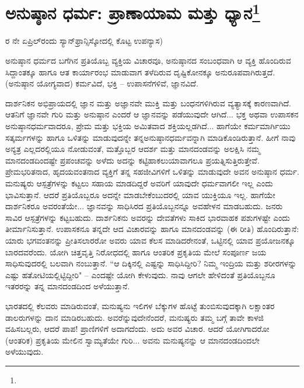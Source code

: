 
\chapter[ಅನುಷ್ಠಾನ ಧರ್ಮ: ಪ್ರಾಣಾಯಾಮ ಮತ್ತು ಧ್ಯಾನ]{ಅನುಷ್ಠಾನ ಧರ್ಮ: ಪ್ರಾಣಾಯಾಮ ಮತ್ತು ಧ್ಯಾನ\protect\footnote{}}

\begin{center}
ರ ನೇ ಏಪ್ರಿಲ್‌ರಂದು ಸ್ಯಾನ್‌ಫ್ರಾನ್ಸಿಸ್ಕೋದಲ್ಲಿ ಕೊಟ್ಟ ಉಪನ್ಯಾಸ)
\end{center}

ಅನುಷ್ಠಾನ ಧರ್ಮದ ಬಗೆಗಿನ ಪ್ರತಿಯೊಬ್ಬ ವ್ಯಕ್ತಿಯ ವಿಚಾರವೂ, ಅನುಷ್ಠಾನದ ಸಂಬಂಧವಾಗಿ ಆ ವ್ಯಕ್ತಿ ಹೊಂದಿರುವ ಸಿದ್ದಾಂತಕ್ಕೂ ಹಾಗೂ ಆತ ಕಾರ್ಯಾರಂಭ ಮಾಡುವಾಗ ತಳೆದಿರುವ ದೃಷ್ಟಿಕೋನಕ್ಕೂ ಅನುರೂಪವಾಗಿರುತ್ತದೆ. (ಅನುಷ್ಠಾನ ಯೋಗ್ಯವಾದ) ಕರ್ಮವಿದೆ, ಭಕ್ತಿ – ಉಪಾಸನೆಗಳಿವೆ, ಜ್ಞಾನವಿದೆ.

ದಾರ್ಶನಿಕನ ಅಭಿಪ್ರಾಯದಲ್ಲಿ ಜ್ಞಾನ ಮತ್ತು ಅಜ್ಞಾನವೇ ಮುಕ್ತಿ ಮತ್ತು ಬಂಧನಗಳಿಗಿರುವ ವ್ಯತ್ಯಾಸಕ್ಕೆ ಕಾರಣವಾಗಿದೆ. ಆತನಿಗೆ ಜ್ಞಾನವೇ ಗುರಿ ಮತ್ತು ಅನುಷ್ಠಾನ ಎಂದರೆ ಆ ಜ್ಞಾನವನ್ನು ಪಡೆಯುವುದೇ ಆಗಿದೆ... ಭಕ್ತ ಅಥವಾ ಉಪಾಸಕನ ಅನುಷ್ಠಾನಧರ್ಮವಾದರೂ, ಪ್ರೇಮ ಮತ್ತು ಭಕ್ತಿಯ ಅಮಿತವಾದ ಶಕ್ತಿಯಲ್ಲಡಗಿದೆ... ಹಾಗೆಯೇ ಕರ್ಮಮಾರ್ಗಿಯು ಸತ್ಕರ್ಮಗಳನ್ನು ಹಾಗೂ ಒಳಿತನ್ನು ಮಾಡುವುದನ್ನೇ ತನ್ನ\break ಅನುಷ್ಠಾನಧರ್ಮವನ್ನಾಗಿ ಮಾಡಿಕೊಂಡಿರುತ್ತಾನೆ. ಹೀಗೆ ನಾವು ಅನ್ಯತ್ರ ಎಲ್ಲದರಲ್ಲಿಯೂ ನೋಡುವಂತೆ, ಮತ್ತೊಬ್ಬರ ಆದರ್ಶ ಮತ್ತು ಮಾನದಂಡವನ್ನು ಅಲಕ್ಷಿಸಿ ನಮ್ಮ ಮಾನದಂಡದಿಂದಷ್ಟೇ ಪ್ರಪಂಚವನ್ನು ಅಳೆದು ಅದನ್ನು ಕಟ್ಟಿಹಾಕಲು\break ಯಾವಾಗಲೂ ಪ್ರಯತ್ನಿಸುತ್ತಿರುತ್ತೇವೆ. ಪ್ರೇಮಭರಿತನಾದ, ಹೃದಯವಂತನಾದ ವ್ಯಕ್ತಿಗೆ ತನ್ನ ಸಹಜೀವಿಗಳಿಗೆ ಒಳಿತನ್ನು ಮಾಡುವುದೇ ಅವನ ಅನುಷ್ಠಾನ ಧರ್ಮ. ಮನುಷ್ಯರು ಆಸ್ಪತ್ರೆಗಳನ್ನು ಕಟ್ಟಲು ಸಹಾಯ ಮಾಡದಿದ್ದರೆ ಅವರಿಗೆ ಯಾವುದೇ ಧರ್ಮವಾಗಲೀ ಇಲ್ಲ ಎಂದು ಭಾವಿಸುತ್ತಾನೆ. ಆದರೆ ಪ್ರತಿಯೊಬ್ಬರೂ ಅದನ್ನೇ ಮಾಡಬೇಕೆಂಬುದರಲ್ಲಿ ಯಾವ ಯುಕ್ತಿಯೂ ಇಲ್ಲ. ಹಾಗೆಯೇ ದಾರ್ಶನಿಕರೂ ಅವರಂತೆಯೇ... ಜ್ಞಾನವನ್ನು ಸಾಧಿಸಿರದ ಪ್ರತಿಯೊಬ್ಬನನ್ನೂ ಅವಹೇಳನ ಮಾಡಬಹುದು. ಜನರು  ಸಾವಿರ ಆಸ್ಪತ್ರೆಗಳನ್ನು ಕಟ್ಟಬಹುದು. ದಾರ್ಶನಿಕನು ಅವರನ್ನು ದೇವತೆಗಳು ಸಾಕಿದ ಭಾರವಾಹಕ ಪಶುಗಳಷ್ಟೇ ಎಂದು ತೀರ್ಮಾನಿಸುತ್ತಾನೆ. ಉಪಾಸಕನೂ ತನ್ನದೇ ಆದ ವಿಚಾರವನ್ನು ಹಾಗೂ ಮಾನದಂಡವನ್ನು (ಈ ರೀತಿ) ಹೊಂದಿರುತ್ತಾನೆ: ಯಾರು ಭಗವಂತನನ್ನು ಪ್ರೀತಿಸಲಾರರೋ ಅವರು ಯಾವ ಕೆಲಸ ಮಾಡಿದರೇನಂತೆ, ಒಟ್ಟಿನಲ್ಲಿ ಯಾವ ಪ್ರಯೋಜನಕ್ಕೂ ಬಾರದವರೆಂದು. ಯೋಗಿ ಚಿತ್ತವೃತ್ತಿ ನಿರೋಧದಲ್ಲಿ ಹಾಗೂ ಆಂತರಿಕ ಪ್ರಕೃತಿಯ ಮೇಲೆ ಸಂಪೂರ್ಣ ಜಯ ಸಾಧಿಸುವುದರಲ್ಲಿ ಬಲವಾಗಿ ನಂಬುತ್ತಾನೆ. “ಆ ದಿಕ್ಕಿನಲ್ಲಿ ಎಷ್ಟನ್ನು ಸಾಧಿಸಿದ್ದೀರಿ? ನಿಮ್ಮ ಇಂದ್ರಿಯ ಮತ್ತು ಶರೀರಗಳನ್ನು ಎಷ್ಟು ಹತೋಟಿಯಲ್ಲಿಟ್ಟಿದ್ದೀರಿ" – ಎಂದಷ್ಟೇ ಯೋಗಿ ಕೇಳುವುದು. ನಾವು ಆಗಲೇ ಹೇಳಿದಂತೆ ಪ್ರತಿಯೊಬ್ಬನೂ ಇತರರನ್ನು ತನ್ನ ಮಾನದಂಡದಿಂದ ಅಳೆಯುತ್ತಾನೆ.

\break

ಭಾರತದಲ್ಲಿ ಕೆಲವರು ಮಾಡಿರುವಂತೆ, ಮನುಷ್ಯನು ಇಲಿಗಳ ಬೆಕ್ಕುಗಳ ಹೊಟ್ಟೆ ತುಂಬಿಸುವುದಕ್ಕಾಗಿ ಲಕ್ಷಾಂತರ ಡಾಲರುಗಳನ್ನು ದಾನ ಮಾಡಿರಬಹುದು. ಅವರೆನ್ನುವುದೇನೆಂದರೆ, ಮನುಷ್ಯರು ತಮ್ಮ ಬಗ್ಗೆ ತಾವೇ ಕಾಳಜಿ ವಹಿಸಬಲ್ಲರು, ಆದರೆ ಪಾಪ! ಪ್ರಾಣಿಗಳಿಗೆ ಅದಾಗದೆಂದು. ಅದು ಅವರ ವಿಚಾರ. ಆದರೆ ಯೋಗಿಗಾದರೋ (ಆಂತರಿಕ) ಪ್ರಕೃತಿಯ ಮೇಲಿನ ಸ್ವಾಮ್ಯತೆಯೇ ಗುರಿ... ಅವನು ಮನುಷ್ಯನನ್ನು ಆ ಮಾನದಂಡದಿಂದಲೇ ಅಳೆಯುವುದು.

